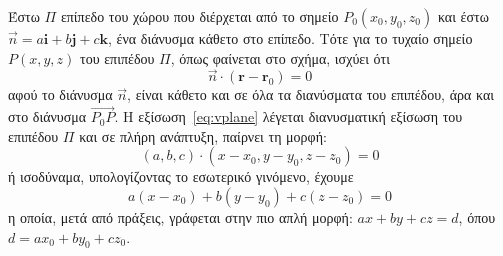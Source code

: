 Έστω $ \Pi $ επίπεδο του χώρου που διέρχεται από το σημείο 
$ P_{0}(x_{0}, y_{0}, z_{0}) $ 
και έστω $ \vec{n} = a \mathbf{i} + b \mathbf{j} + c \mathbf{k} $, ένα διάνυσμα κάθετο 
στο επίπεδο. Τότε για το τυχαίο σημείο $ P(x,y,z) $ του επιπέδου $ \Pi $, όπως φαίνεται 
στο σχήμα, ισχύει ότι 
\begin{equation}\label{eq:vplane}
  \vec{n} \cdot (\mathbf{r} - \mathbf{r}_{0}) = 0
\end{equation} 
αφού το διάνυσμα $ \vec{n} $, είναι κάθετο και σε όλα τα διανύσματα του επιπέδου, άρα 
και στο διάνυσμα $ \vec{P_{0}P} $. 
Η εξίσωση~\eqref{eq:vplane} λέγεται \textcolor{Col1}{διανυσματική} εξίσωση του 
επιπέδου $ \Pi $ και σε πλήρη ανάπτυξη, παίρνει τη μορφή:
\begin{equation*}
  (a,b,c) \cdot (x- x_{0}, y- y_{0}, z- z_{0}) = 0 
\end{equation*} 
ή ισοδύναμα, υπολογίζοντας το εσωτερικό γινόμενο, έχουμε
\begin{equation}
  \boxed{a(x- x_{0}) + b(y- y_{0}) + c(z- z_{0}) = 0}
\end{equation}
η οποία, μετά από πράξεις, γράφεται στην πιο απλή μορφή:
$ ax+by+cz=d $, όπου $ d=a x_{0}+ b y_{0}+cz_{0} $.



